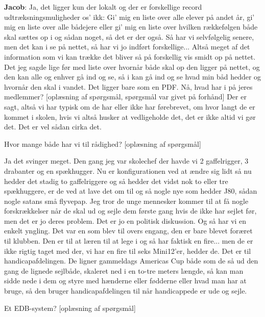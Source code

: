 \textbf{Jacob}: Ja, det ligger kun der lokalt og der er forskellige record udtræksningsmuligheder os' ikk: Gi' mig en liste over alle elever på andet år, gi' mig en liste over alle bådejere eller gi' mig en liste over hvilken rækkefølgen både skal sættes op i og sådan noget, så det er der også. Så har vi selvfølgelig senere, men det kan i se på nettet, så har vi jo indført forskellige... Altså meget af det information som vi kan trække det bliver så på forskellig vis smidt op på nettet. Det jeg sagde lige før med liste over hvornår både skal op den ligger på nettet, og den kan alle og enhver gå ind og se, så i kan gå ind og se hvad min båd hedder og hvornår den skal i vandet. Det ligger bare som en PDF. 
Nå, hvad har i på jeres medlemmer? [oplæsning af spørgsmål, spørgsmål var givet på forhånd] Der er sagt, altså vi har typisk om de har eller ikke har førebrevet, om hvor langt de er kommet i skolen, hvis vi altså husker at vedligeholde det, det er ikke altid vi gør det. Det er vel sådan cirka det. 

Hvor mange både har vi til rådighed? [oplæsning af spørgsmål]

Ja det svinger meget. Den gang jeg var skolechef der havde vi 2 gaffelrigger, 3 drabanter og en spækhugger. Nu er konfigurationen ved at ændre sig lidt så nu hedder det stadig to gaffelriggere og så hedder det vidst nok to eller tre spækhuggere, er de ved at lave det om til og så nogle nye som hedder J80, sådan nogle satans små flyvepap. Jeg tror de unge mennesker kommer til at få nogle forskrækkelser når de skal ud og sejle dem første gang hvis de ikke har sejlet før, men det er jo deres problem. Det er jo en politisk diskussion. Og så har vi en enkelt yngling. Det var en som blev til overs engang, den er bare blevet foræret til klubben. Den er til at læren til at lege i og så har faktisk en fire... men de er ikke rigtig taget med der, vi har en fire til seks Mini12'er, hedder de. Det er til handicapafdelingen. De ligner gammeldags Americas Cup både som de så ud den gang de lignede sejlbåde, skaleret ned i en to-tre meters længde, så kan man sidde nede i dem og styre med hænderne eller fødderne eller hvad man har at bruge, så den bruger handicapafdelingen til når handicappede er ude og sejle. 

Et EDB-system? [oplæsning af spørgsmål]

